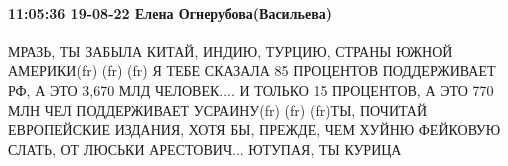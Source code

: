  
 
 
 
 

\paragraph{11:05:36 19-08-22 Елена Огнерубова(Васильева)}

МРАЗЬ, ТЫ ЗАБЫЛА КИТАЙ, ИНДИЮ, ТУРЦИЮ, СТРАНЫ ЮЖНОЙ АМЕРИКИ(fr) (fr) (fr) Я
ТЕБЕ СКАЗАЛА 85 ПРОЦЕНТОВ ПОДДЕРЖИВАЕТ РФ, А ЭТО 3,670 МЛД ЧЕЛОВЕК.... И ТОЛЬКО
15 ПРОЦЕНТОВ, А ЭТО 770 МЛН ЧЕЛ ПОДДЕРЖИВАЕТ УСРАИНУ(fr) (fr) (fr)ТЫ, ПОЧИТАЙ
ЕВРОПЕЙСКИЕ ИЗДАНИЯ, ХОТЯ БЫ, ПРЕЖДЕ, ЧЕМ ХУЙНЮ ФЕЙКОВУЮ СЛАТЬ, ОТ ЛЮСЬКИ
АРЕСТОВИЧ... ЮТУПАЯ, ТЫ КУРИЦА🤣🤣🤣

